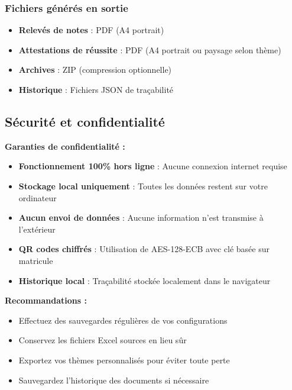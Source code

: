 \subsubsection{Fichiers générés en sortie}

\begin{itemize}[leftmargin=*]
    \item \textbf{Relevés de notes} : PDF (A4 portrait)
    \item \textbf{Attestations de réussite} : PDF (A4 portrait ou paysage selon thème)
    \item \textbf{Archives} : ZIP (compression optionnelle)
    \item \textbf{Historique} : Fichiers JSON de traçabilité
\end{itemize}

\subsection{Sécurité et confidentialité}

\begin{tcolorbox}[colback=yellow!10!white,colframe=orange!75!black,title=Protection des données]
\textbf{Garanties de confidentialité :}
\begin{itemize}[leftmargin=*]
    \item \textbf{Fonctionnement 100\% hors ligne} : Aucune connexion internet requise
    \item \textbf{Stockage local uniquement} : Toutes les données restent sur votre ordinateur
    \item \textbf{Aucun envoi de données} : Aucune information n'est transmise à l'extérieur
    \item \textbf{QR codes chiffrés} : Utilisation de AES-128-ECB avec clé basée sur matricule
    \item \textbf{Historique local} : Traçabilité stockée localement dans le navigateur
\end{itemize}

\textbf{Recommandations :}
\begin{itemize}[leftmargin=*]
    \item Effectuez des sauvegardes régulières de vos configurations
    \item Conservez les fichiers Excel sources en lieu sûr
    \item Exportez vos thèmes personnalisés pour éviter toute perte
    \item Sauvegardez l'historique des documents si nécessaire
\end{itemize}
\end{tcolorbox}

